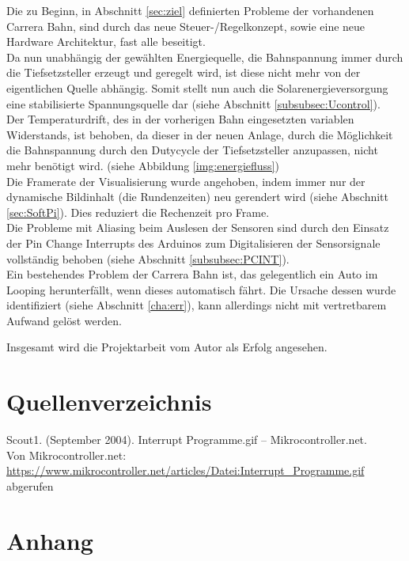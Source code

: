 \documentclass[a4paper, 11pt]{report}
\begin{document}
Die zu Beginn, in Abschnitt \ref{sec:ziel} definierten Probleme der vorhandenen Carrera Bahn, sind durch das neue Steuer-/Regelkonzept, sowie eine neue Hardware Architektur, fast alle beseitigt.\\
Da nun unabhängig der gewählten Energiequelle, die Bahnspannung immer durch die Tiefsetzsteller erzeugt und geregelt wird, ist diese nicht mehr von der eigentlichen Quelle abhängig.
Somit stellt nun auch die Solarenergieversorgung eine stabilisierte Spannungsquelle dar (siehe Abschnitt \ref{subsubsec:Ucontrol}).\\
Der Temperaturdrift, des in der vorherigen Bahn eingesetzten variablen Widerstands, ist behoben, da dieser in der neuen Anlage, durch die Möglichkeit die Bahnspannung durch den Dutycycle der Tiefsetzsteller anzupassen, nicht mehr benötigt wird. (siehe Abbildung \ref{img:energiefluss})\\
Die Framerate der Visualisierung wurde angehoben, indem immer nur der dynamische Bildinhalt (die Rundenzeiten) neu gerendert wird (siehe Abschnitt \ref{sec:SoftPi}). Dies reduziert die Rechenzeit pro Frame.\\
Die Probleme mit Aliasing beim Auslesen der Sensoren sind durch den Einsatz der \glqq Pin Change Interrupts\grqq{} des Arduinos zum Digitalisieren der Sensorsignale vollständig behoben (siehe Abschnitt \ref{subsubsec:PCINT}).\\

Ein bestehendes Problem der Carrera Bahn ist, das gelegentlich ein Auto im Looping herunterfällt, wenn dieses automatisch fährt. Die Ursache dessen wurde identifiziert (siehe Abschnitt \ref{cha:err}), kann allerdings nicht mit vertretbarem Aufwand gelöst werden.

Insgesamt wird die Projektarbeit vom Autor als Erfolg angesehen.
\chapter{Quellenverzeichnis}
Scout1. (September 2004). Interrupt Programme.gif – Mikrocontroller.net.
\\Von Mikrocontroller.net: \href{https://www.mikrocontroller.net/articles/Datei:Interrupt_Programme.gif}
{\url{https://www.mikrocontroller.net/articles/Datei:Interrupt_Programme.gif}} abgerufen \label{src:scout1}
\chapter{Anhang}
\end{document}

